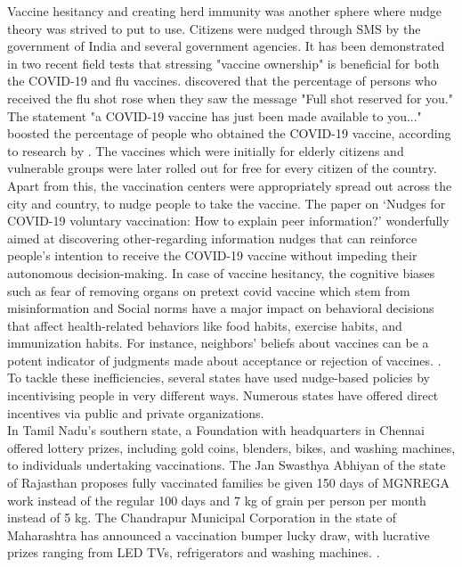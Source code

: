 \documentclass[12pt, a4paper]{article}
\begin{document}
Vaccine hesitancy and creating herd immunity was another sphere where nudge theory was strived to put to use. Citizens were nudged through SMS by the government of India and several government agencies. It has been demonstrated in two recent field tests that stressing "vaccine ownership" is beneficial for both the COVID-19 and flu vaccines. \citep{article5} discovered that the percentage of persons who received the flu shot rose when they saw the message "Full shot reserved for you." The statement "a COVID-19 vaccine has just been made available to you..." boosted the percentage of people who obtained the COVID-19 vaccine, according to research by \citep{article6}. The vaccines which were initially for elderly citizens and vulnerable groups were later rolled out for free for every citizen of the country. Apart from this, the vaccination centers were appropriately spread out across the city and country, to nudge people to take the vaccine. The paper on ‘Nudges for COVID-19 voluntary vaccination: How to explain peer information?’ \citep{article8} wonderfully aimed at discovering other-regarding information nudges that can reinforce people’s intention to receive the COVID-19 vaccine without impeding their autonomous decision-making. In case of vaccine hesitancy, the cognitive biases such as fear of removing organs on pretext covid vaccine which stem from misinformation and Social norms have a major impact on behavioral decisions that affect health-related behaviors like food habits, exercise habits, and immunization habits. For instance, neighbors' beliefs about vaccines can be a potent indicator of judgments made about acceptance or rejection of vaccines. \citep{article7}. To tackle these inefficiencies, several states have used nudge-based policies by incentivising people in very different ways. Numerous states have offered direct incentives via public and private organizations.\\
In Tamil Nadu's southern state, a Foundation with headquarters in Chennai offered lottery prizes, including gold coins, blenders, bikes, and washing machines, to individuals undertaking vaccinations. The Jan Swasthya Abhiyan of the state of Rajasthan proposes fully vaccinated families be given 150 days of MGNREGA work instead of the regular 100 days and 7 kg of grain per person per month instead of 5 kg. The Chandrapur Municipal Corporation in the state of Maharashtra has announced a vaccination bumper lucky draw, with lucrative prizes ranging from LED TVs, refrigerators and washing machines. \citep{article7}.\\ 
\end{document}
